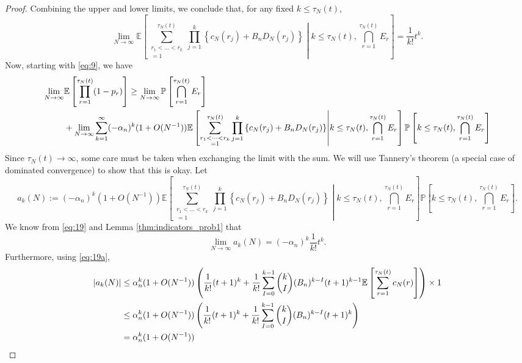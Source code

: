 \documentclass{article}
\newcommand{\Prob}{\mathbb{P}}
\newcommand{\E}{\mathbb{E}}
\newcommand{\1}[1]{\mathbbm{1}_{#1}}
\begin{document}
\begin{proof}
Combining the upper and lower limits, we conclude that, for any fixed $k\leq \tau_N(t)$,
\begin{equation}\label{eq:19}
\lim_{N\to\infty} \E \left[ \sum_{\substack{r_1<\dots<r_k \\ =1}}^{\tau_N(t)}\prod_{j=1}^k 
\left\{ c_N(r_j) + B_n D_N(r_j) \right\} 
\middle| k\leq\tau_N(t), \bigcap_{r=1}^{\tau_N(t)} E_r \right]
= \frac{1}{k!} t^k .
\end{equation}
Now, starting with \eqref{eq:9}, we have
\begin{align}\label{eq:21a}
\lim_{N\to\infty} &\E \left[ \prod_{r=1}^{\tau_N(t)} (1-p_r) \right]
\geq \lim_{N\to\infty} \Prob \left[ \bigcap_{r=1}^{\tau_N(t)} E_r \right] \notag\\
&+ \lim_{N\to\infty} \sum_{k=1}^\infty (- \alpha_n)^k (1+O(N^{-1}))
\E \left[ \sum_{\substack{r_1<\dots<r_k \\ =1}}^{\tau_N(t)}\prod_{j=1}^k 
\left\{ c_N(r_j) + B_n D_N(r_j) \right\} \middle| k\leq\tau_N(t), \bigcap_{r=1}^{\tau_N(t)} E_r \right]
\Prob \left[ k \leq \tau_N(t) , \bigcap_{r=1}^{\tau_N(t)} E_r \right]
\end{align}
Since $\tau_N(t) \to \infty$, some care must be taken when exchanging the limit with the sum. We will use Tannery's theorem (a special case of dominated convergence) to show that this is okay.
Let 
\begin{equation}
a_k(N) := (- \alpha_n)^k (1+O(N^{-1}))
\E \left[ \sum_{\substack{r_1<\dots<r_k \\ =1}}^{\tau_N(t)}\prod_{j=1}^k 
\left\{ c_N(r_j) + B_n D_N(r_j) \right\} \middle| k\leq\tau_N(t), \bigcap_{r=1}^{\tau_N(t)} E_r \right]
\Prob \left[ k \leq \tau_N(t) , \bigcap_{r=1}^{\tau_N(t)} E_r \right] .
\end{equation}
We know from \eqref{eq:19} and Lemma \ref{thm:indicators_prob1} that
\begin{equation}
\lim_{N\to\infty} a_k(N) = (-\alpha_n)^k \frac{1}{k!}t^k .
\end{equation}
Furthermore, using \eqref{eq:19a},
\begin{align}
|a_k(N)| 
&\leq \alpha_n^k (1+O(N^{-1}))
\left( \frac{1}{k!} (t+1)^k + \frac{1}{k!} \sum_{I=0}^{k-1} \binom{k}{I} (B_n)^{k-I} (t+1)^{k-1} \E \left[ \sum_{r=1}^{\tau_N(t)} c_N(r) \right] \right) \times 1 \notag\\
&\leq \alpha_n^k (1+O(N^{-1}))
\left( \frac{1}{k!} (t+1)^k + \frac{1}{k!} \sum_{I=0}^{k-1} \binom{k}{I} (B_n)^{k-I} (t+1)^k \right) \notag\\
&= \alpha_n^k (1+O(N^{-1}))

\end{align}
\end{proof}
\end{document}
